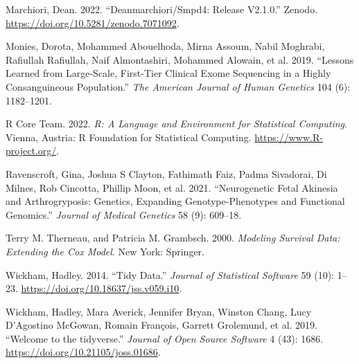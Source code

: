 \documentclass[
  letterpaper,
  DIV=11,
  numbers=noendperiod]{scrartcl}
\newlength{\cslhangindent}
\newlength{\cslentryspacingunit} %
\newenvironment{CSLReferences}[2] %
 {%
  \setlength{\parindent}{0pt}
  \ifodd #1
  \let\oldpar\par
  \def\par{\hangindent=\cslhangindent\oldpar}
  \fi
  \setlength{\parskip}{#2\cslentryspacingunit}
 }%
 {}
\begin{document}
\begin{CSLReferences}{1}{0}
\leavevmode{}%
Marchiori, Dean. 2022. {``Deanmarchiori/Smpd4: Release V2.1.0.''}
Zenodo. \url{https://doi.org/10.5281/zenodo.7071092}.

\leavevmode{}%
Monies, Dorota, Mohammed Abouelhoda, Mirna Assoum, Nabil Moghrabi,
Rafiullah Rafiullah, Naif Almontashiri, Mohammed Alowain, et al. 2019.
{``Lessons Learned from Large-Scale, First-Tier Clinical Exome
Sequencing in a Highly Consanguineous Population.''} \emph{The American
Journal of Human Genetics} 104 (6): 1182--1201.

\leavevmode{}%
R Core Team. 2022. \emph{R: A Language and Environment for Statistical
Computing}. Vienna, Austria: R Foundation for Statistical Computing.
\url{https://www.R-project.org/}.

\leavevmode{}%
Ravenscroft, Gina, Joshua S Clayton, Fathimath Faiz, Padma Sivadorai, Di
Milnes, Rob Cincotta, Phillip Moon, et al. 2021. {``Neurogenetic Fetal
Akinesia and Arthrogryposis: Genetics, Expanding Genotype-Phenotypes and
Functional Genomics.''} \emph{Journal of Medical Genetics} 58 (9):
609--18.

\leavevmode{}%
Terry M. Therneau, and Patricia M. Grambsch. 2000. \emph{Modeling
Survival Data: Extending the {C}ox Model}. New York: Springer.

\leavevmode{}%
Wickham, Hadley. 2014. {``Tidy Data.''} \emph{Journal of Statistical
Software} 59 (10): 1--23. \url{https://doi.org/10.18637/jss.v059.i10}.

\leavevmode{}%
Wickham, Hadley, Mara Averick, Jennifer Bryan, Winston Chang, Lucy
D'Agostino McGowan, Romain François, Garrett Grolemund, et al. 2019.
{``Welcome to the {tidyverse}.''} \emph{Journal of Open Source Software}
4 (43): 1686. \url{https://doi.org/10.21105/joss.01686}.

\end{CSLReferences}
\end{document}
